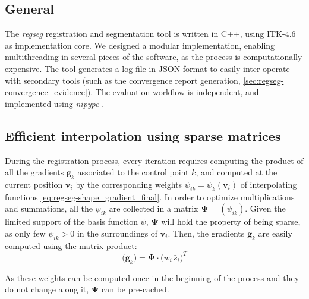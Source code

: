 \documentclass[a4paper]{report}
\renewcommand{\vec}[1]{\mathbf{#1}}
\begin{document}
\subsection{General} The \emph{regseg} registration and segmentation tool is written in C++, using ITK-4.6
  \citep{ibanez_itk_2005} as  implementation core.
We designed a modular implementation, enabling multithreading in several pieces of the software,
  as the process is computationally expensive.
The tool generates a log-file in JSON format to easily inter-operate with secondary tools (such
  as the convergence report generation, \autoref{sec:regseg-convergence_evidence}).
The evaluation workflow is independent, and implemented using \emph{nipype} \citep{gorgolewski_nipype_2011}.

\subsection{Efficient interpolation using sparse matrices}
During the registration process, every iteration requires computing the product of all the gradients
  $\vec{g}_k$ associated to the control point $k$, and computed at the current position
  $\vec{v}_i$ by the corresponding weights $\psi_{ik} = \psi_k(\mathbf{v}_i)$ of interpolating functions
  \eqref{eq:regseg-shape_gradient_final}.
In order to optimize multiplications and summations, all the $\psi_{ik}$ are collected in a
  matrix $\boldsymbol{\Psi} = (\psi_{ik})$.
Given the limited support of the basis function $\psi$, $\boldsymbol{\Psi}$ will hold the property
  of being sparse, as only few $\psi_{ik} > 0$ in the surroundings of $\vec{v}_i$.
Then, the gradients $\vec{g}_k$ are easily computed using the matrix product:
\begin{equation}
  \big(\vec{g}_k \big) = \boldsymbol{\Psi} \cdot \big( w_i \, \bar{s}_i \big)^T
  \label{eq:regseg-sparse_matrix}
\end{equation}

As these weights can be computed once in the beginning of the process and they do not change along
  it, $\boldsymbol{\Psi}$ can be pre-cached.
\end{document}
